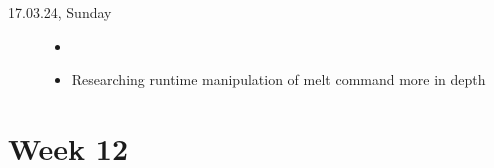 \documentclass[a4, 11pt]{scrartcl}
\begin{document}
\begin{description}
	





\item[17.03.24, Sunday]
\begin{itemize}
	\item[]
	\item Researching runtime manipulation of melt command more in depth
\end{itemize}




	
	

	
	
\end{description}	











\newpage
\section*{Week 12}	
\end{document}
